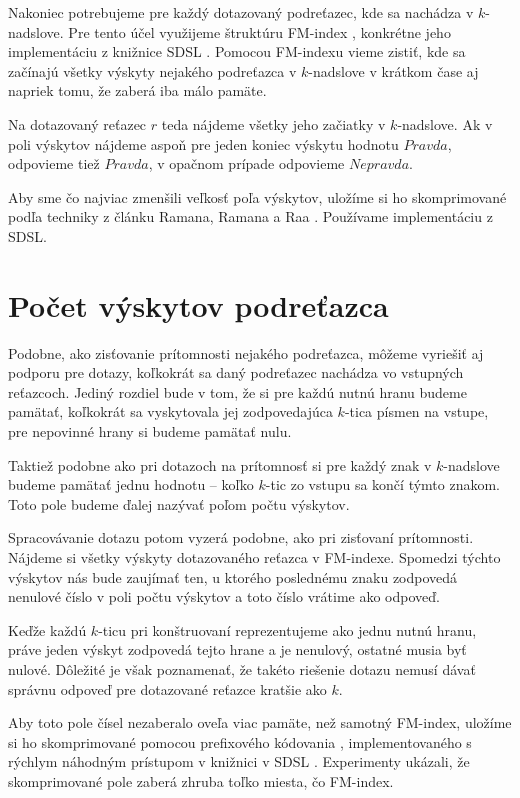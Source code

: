 Nakoniec potrebujeme pre každý dotazovaný podreťazec, kde sa nachádza v $k$-nadslove.
Pre tento účel využijeme štruktúru FM-index \cite{fm_index}, konkrétne jeho implementáciu
z knižnice SDSL \cite{sdsl}. Pomocou FM-indexu vieme zistiť, kde sa začínajú všetky
výskyty nejakého podreťazca v $k$-nadslove v krátkom čase aj napriek tomu, že
zaberá iba málo pamäte.

Na dotazovaný reťazec $r$ teda nájdeme všetky jeho začiatky v $k$-nadslove. Ak
v poli výskytov nájdeme aspoň pre jeden koniec výskytu hodnotu $Pravda$, odpovieme
tiež $Pravda$, v opačnom prípade odpovieme $Nepravda$.

Aby sme čo najviac zmenšili veľkosť poľa výskytov, uložíme si ho skomprimované
podľa techniky z článku Ramana, Ramana a Raa \cite{rrr_vector}. Používame implementáciu
z SDSL.

\section{Počet výskytov podreťazca}

Podobne, ako zisťovanie prítomnosti nejakého podreťazca, môžeme vyriešiť aj podporu
pre dotazy, koľkokrát sa daný podreťazec nachádza vo vstupných reťazcoch. Jediný rozdiel
bude v tom, že si pre každú nutnú hranu budeme pamätať, koľkokrát sa vyskytovala jej
zodpovedajúca $k$-tica písmen na vstupe, pre nepovinné hrany si budeme pamätať nulu.

Taktiež podobne ako pri dotazoch na prítomnosť si pre každý znak v $k$-nadslove
budeme pamätať jednu hodnotu -- koľko $k$-tic zo vstupu sa končí týmto znakom. Toto
pole budeme ďalej nazývať poľom počtu výskytov.

Spracovávanie dotazu potom vyzerá podobne, ako pri zisťovaní prítomnosti. Nájdeme
si všetky výskyty dotazovaného reťazca v FM-indexe. Spomedzi týchto výskytov nás
bude zaujímať ten, u ktorého poslednému znaku zodpovedá nenulové číslo
v poli počtu výskytov a toto číslo vrátime ako odpoveď. 

Keďže každú $k$-ticu pri konštruovaní
reprezentujeme ako jednu nutnú hranu, práve jeden výskyt zodpovedá tejto hrane a
je nenulový, ostatné musia byť nulové. Dôležité je však poznamenať, že takéto
riešenie dotazu nemusí dávať správnu odpoveď pre dotazované reťazce kratšie ako $k$.

Aby toto pole čísel nezaberalo oveľa viac pamäte, než samotný FM-index, uložíme
si ho skomprimované pomocou prefixového kódovania \cite{integer_coding}, implementovaného
s rýchlym náhodným prístupom v knižnici v SDSL \cite{sdsl}.
Experimenty ukázali, že skomprimované pole zaberá zhruba toľko miesta,
čo FM-index.

